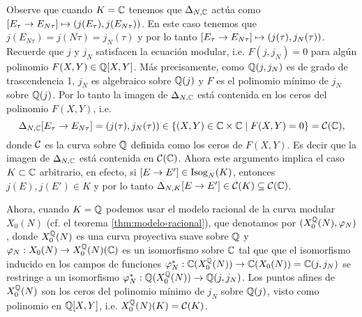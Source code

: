 Observe que cuando $K=\mathbb{C}$ tenemos que $\Delta_{N,\mathbb{C}}$ actúa como $[E_\tau\rightarrow E_{N\tau}]\mapsto (j(E_\tau),j(E_{N\tau}))$. En este caso tenemos que $j(E_{N\tau})=j(N\tau)=j_N(\tau)$ y por lo tanto $[E_\tau\rightarrow E_{N\tau}]\mapsto (j(\tau),j_N(\tau))$. Recuerde que $j$ y $j_N$ satisfacen la ecuación modular, i.e. $F(j,j_N)=0$ para algún polinomio $F(X,Y)\in\mathbb{Q}[X,Y]$. Más precisamente, como $\mathbb{Q}(j,j_N)$ es de grado de trascendencia 1, $j_N$ es algebraico sobre $\mathbb{Q}(j)$ y $F$ es el polinomio mínimo de $j_N$ sobre $\mathbb{Q}(j)$. Por lo tanto la imagen de $\Delta_{N,\mathbb{C}}$ está contenida en los ceros del polinomio $F(X,Y)$, i.e.
\[
	\Delta_{N,\mathbb{C}}[E_\tau\rightarrow E_{N\tau}]=(j(\tau),j_N(\tau))\in \{(X,Y)\in\mathbb{C}\times\mathbb{C}\mid F(X,Y)=0\}=\mathcal{C}(\mathbb{C}),
\]
donde $\mathcal{C}$ es la curva sobre $\mathbb{Q}$ definida como los ceros de $F(X,Y)$. Es decir que la imagen de $\Delta_{N,\mathbb{C}}$ está contenida en $\mathcal{C}(\mathbb{C})$. Ahora este argumento implica el caso $K\subset\mathbb{C}$ arbitrario, en efecto, si $[E\rightarrow E']\in\mathrm{Isog}_N(K)$, entonces $j(E),j(E')\in K$ y por lo tanto $\Delta_{N,K}[E\rightarrow E']\in\mathcal{C}(K)\subseteq\mathcal{C}(\mathbb{C})$.

Ahora, cuando $K=\mathbb{Q}$ podemos usar el modelo racional de la curva modular $X_0(N)$ (cf. el teorema \ref{thm:modelo-racional}), que denotamos por $(X^{\mathbb{Q}}_0(N),\varphi_N)$, donde $X^{\mathbb{Q}}_0(N)$ es una curva proyectiva suave sobre $\mathbb{Q}$ y $\varphi_N:X_0(N)\rightarrow X^{\mathbb{Q}}_0(N)(\mathbb{C})$ es un isomorfismo sobre $\mathbb{C}$ tal que que el isomorfismo inducido en los campos de funciones $\varphi_N^*:\mathbb{C}(X^{\mathbb{Q}}_0(N))\rightarrow\mathbb{C}(X_0(N))=\mathbb{C}(j,j_N)$ se restringe a un isomorfismo $\varphi_N^*:\mathbb{Q}(X^{\mathbb{Q}}_0(N))\rightarrow\mathbb{Q}(j,j_N)$. Los puntos afines de $X^{\mathbb{Q}}_0(N)$ son los ceros del polinomio mínimo de $j_N$ sobre $\mathbb{Q}(j)$, visto como polinomio en $\mathbb{Q}[X,Y]$, i.e. $X^{\mathbb{Q}}_0(N)(K)=\mathcal{C}(K)$.

